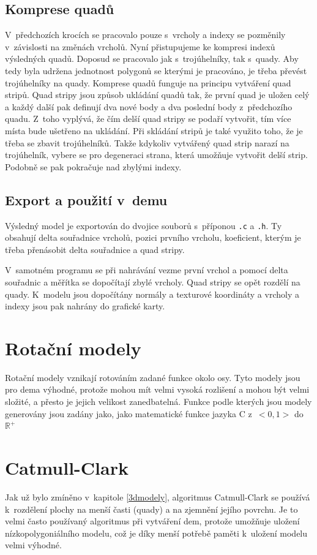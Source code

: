 \subsection {Komprese quadů}
V~předchozích krocích se pracovalo pouze s~vrcholy a indexy se pozměnily v~závislosti na změnách vrcholů.
Nyní přistupujeme ke kompresi indexů výsledných quadů.
Doposud se pracovalo jak s~trojúhelníky, tak s~quady.
Aby tedy byla udržena jednotnost polygonů se kterými je pracováno, je třeba převést trojúhelníky na quady.
Komprese quadů funguje na principu vytváření quad stripů. 
Quad stripy jsou způsob ukládání quadů tak, že první quad je uložen celý a každý další pak definují dva nové body a dva poslední body z~předchozího quadu.
Z~toho vyplývá, že čím delší quad stripy se podaří vytvořit, tím více místa bude ušetřeno na ukládání.
Při skládání stripů je také využito toho, že je třeba se zbavit trojúhelníků.
Takže kdykoliv vytvářený quad strip narazí na trojúhelník, vybere se pro degeneraci strana, která umožňuje vytvořit delší strip. 
Podobně se pak pokračuje nad zbylými indexy.
\subsection {Export a použití v~demu}
Výsledný model je exportován do dvojice souborů s~příponou \texttt{.c} a \texttt{.h}.
Ty obsahují delta souřadnice vrcholů, pozici prvního vrcholu, koeficient, kterým je třeba přenásobit delta souřadnice a quad stripy.

V~samotném programu se při nahrávání vezme první vrchol a pomocí delta souřadnic a měřítka se dopočítají zbylé vrcholy.
Quad stripy se opět rozdělí na quady. K~modelu jsou dopočítány normály a texturové koordináty a vrcholy a indexy jsou pak nahrány do grafické karty.

\section {Rotační modely}
Rotační modely vznikají rotováním zadané funkce okolo osy. Tyto modely jsou pro dema výhodné, protože mohou mít velmi vysoká rozlišení a mohou být velmi složité, a přesto je jejich velikost zanedbatelná.
Funkce podle kterých jsou modely generovány jsou zadány jako, jako matematické funkce jazyka C z~$<0,1>$ do $\mathbb{R}^{+}$

\section {Catmull-Clark} \label{catmull}
Jak už bylo zmíněno v~kapitole \ref{3dmodely}, algoritmus Catmull-Clark se používá k~rozdělení plochy na menší časti (quady) a na zjemnění jejího povrchu.
Je to velmi často používaný algoritmus při vytváření dem, protože umožňuje uložení nízkopolygoniálního modelu, což je díky menší potřebě paměti k~uložení modelu velmi výhodné.

